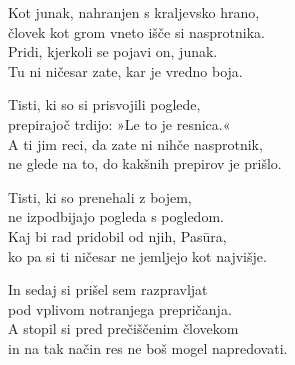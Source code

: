Kot junak, nahranjen s kraljevsko hrano,\\
človek kot grom vneto išče si nasprotnika.\\
Pridi, kjerkoli se pojavi on, junak.\\
Tu ni ničesar zate, kar je vredno boja.

Tisti, ki so si prisvojili poglede,\\
prepirajoč trdijo: »Le to je resnica.«\\
A ti jim reci, da zate ni nihče nasprotnik,\\
ne glede na to, do kakšnih prepirov je prišlo.

\clearpage

Tisti, ki so prenehali z bojem,\\
ne izpodbijajo pogleda s pogledom.\\
Kaj bi rad pridobil od njih, Pasūra,\\
ko pa si ti ničesar ne jemljejo kot najvišje.

In sedaj si prišel sem razpravljat\\
pod vplivom notranjega prepričanja.\\
A stopil si pred prečiščenim človekom\\
in na tak način res ne boš mogel napredovati.

